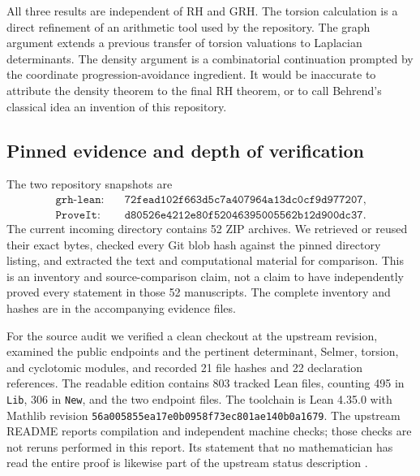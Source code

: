 All three results are independent of RH and GRH. The torsion calculation is a
direct refinement of an arithmetic tool used by the repository. The graph
argument extends a previous transfer of torsion valuations to Laplacian
determinants. The density argument is a combinatorial continuation prompted by
the coordinate progression-avoidance ingredient. It would be inaccurate to
attribute the density theorem to the final RH theorem, or to call Behrend's
classical idea an invention of this repository.

\subsection{Pinned evidence and depth of verification}
The two repository snapshots are
\begin{align*}
\texttt{grh-lean}:&\quad\texttt{72fead102f663d5c7a407964a13dc0cf9d977207},\\
\texttt{ProveIt}:&\quad\texttt{d80526e4212e80f52046395005562b12d900dc37}.
\end{align*}
The current incoming directory contains 52 ZIP archives. We retrieved or reused
their exact bytes, checked every Git blob hash against the pinned directory
listing, and extracted the text and computational material for comparison.
This is an inventory and source-comparison claim, not a claim to have independently
proved every statement in those 52 manuscripts. The complete inventory and hashes
are in the accompanying evidence files.

For the source audit we verified a clean checkout at the upstream revision,
examined the public endpoints and the pertinent determinant, Selmer, torsion, and
cyclotomic modules, and recorded 21 file hashes and 22 declaration references.
The readable edition contains 803 tracked Lean files, counting 495 in
\texttt{Lib}, 306 in \texttt{New}, and the two endpoint files. The toolchain is
Lean 4.35.0 with Mathlib revision
\texttt{56a005855ea17e0b0958f73ec801ae140b0a1679}.
The upstream README reports compilation and independent machine checks; those
checks are not reruns performed in this report. Its statement that no
mathematician has read the entire proof is likewise part of the upstream status
description \cite{upstream}.

